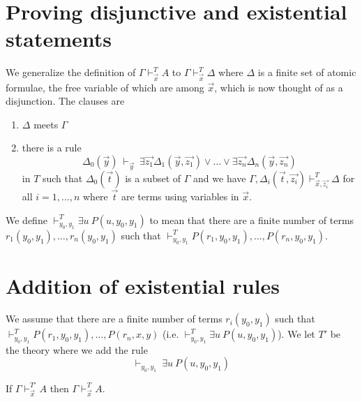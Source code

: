 \documentclass[10pt,a4paper]{article}
\begin{document}
\section{Proving disjunctive and existential statements}

 We generalize the definition of $\Gamma\vdash_{\vec{x}}^T A$ to 
$\Gamma\vdash_{\vec{x}}^T \Delta$ where $\Delta$ is a finite set of atomic formulae, the free
variable of which are among $\vec{x}$, which is now thought of as a disjunction. The clauses are

\begin{enumerate}
\item $\Delta$ meets $\Gamma$

\item there is a rule
$$
\Delta_0(\vec{y})~\vdash_{\vec{y}}~
\exists \vec{z_1}\Delta_1(\vec{y},\vec{z_1})\vee\dots\vee\exists \vec{z_n}\Delta_n(\vec{y},\vec{z_n})
$$
in $T$ such that $\Delta_0(\vec{t})$ is a subset of $\Gamma$ and
we have $\Gamma,\Delta_i(\vec{t},\vec{z_i})\vdash^T_{\vec{x},\vec{z_i}} \Delta$ for all $i = 1,\dots,n$
where $\vec{t}$ are terms using variables in $\vec{x}$.
\end{enumerate}

 We define $\vdash_{y_0,y_1}^T \exists u~P(u,y_0,y_1)$ to mean that there are a finite number
of terms $r_1(y_0,y_1),\dots,r_n(y_0,y_1)$ such that
$\vdash_{y_0,y_1}^T P(r_1,y_0,y_1),\dots,P(r_n,y_0,y_1)$.


\section{Addition of existential rules}

 We assume that there are a finite number
of terms $r_i(y_0,y_1)$ such that
$\vdash_{y_0,y_1}^T P(r_1,y_0,y_1),\dots,P(r_n,x,y)$ (i.e. $\vdash_{y_0,y_1}^T \exists u~P(u,y_0,y_1)$).
We let $T'$ be the theory where we add the rule
$$
\vdash_{y_0,y_1}~\exists u~P(u,y_0,y_1)
$$

\begin{lemma}
If $\Gamma\vdash_{\vec{x}}^{T'} A$ then $\Gamma\vdash_{\vec{x}}^T A$.
\end{lemma}
\end{document}
